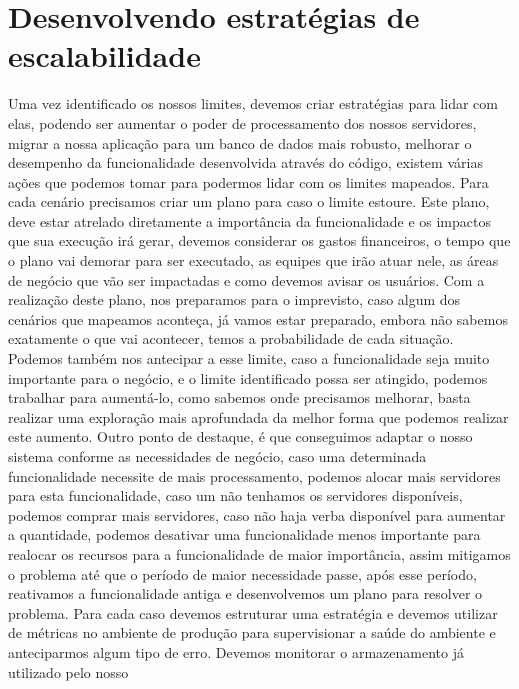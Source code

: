     \section{Desenvolvendo estratégias de escalabilidade}
      Uma vez identificado os nossos limites, devemos criar estratégias para lidar
      com elas, podendo ser aumentar o poder de processamento dos nossos servidores,
      migrar a nossa aplicação para um banco de dados mais robusto, melhorar o
      desempenho da funcionalidade desenvolvida através do código, existem
      várias ações que podemos tomar para podermos lidar com os limites mapeados.
      Para cada cenário precisamos criar um plano para caso o limite estoure. Este
      plano, deve estar atrelado diretamente a importância da funcionalidade e os
      impactos que sua execução irá gerar, devemos considerar os gastos financeiros,
      o tempo que o plano vai demorar para ser executado, as equipes que irão atuar
      nele, as áreas de negócio que vão ser impactadas e como devemos avisar os
      usuários. Com a realização deste plano, nos preparamos para o imprevisto,
      caso algum dos cenários que mapeamos aconteça, já vamos estar preparado,
      embora não sabemos exatamente o que vai acontecer, temos a probabilidade de
      cada situação. Podemos também nos antecipar a esse limite, caso a funcionalidade
      seja muito importante para o negócio, e o limite identificado possa ser atingido,
      podemos trabalhar para aumentá-lo, como sabemos onde precisamos melhorar,
      basta realizar uma exploração mais aprofundada da melhor forma que podemos
      realizar este aumento. Outro ponto de destaque, é que conseguimos adaptar o
      nosso sistema conforme as necessidades de negócio, caso uma determinada
      funcionalidade necessite de mais processamento, podemos alocar mais servidores
      para esta funcionalidade, caso um não tenhamos os servidores disponíveis,
      podemos comprar mais servidores, caso não haja verba disponível para aumentar
      a quantidade, podemos desativar uma funcionalidade menos importante para
      realocar os recursos para a funcionalidade de maior importância, assim
      mitigamos o problema até que o período de maior necessidade passe, após esse
      período, reativamos a funcionalidade antiga e desenvolvemos um plano para
      resolver o problema. \newline
      Para cada caso devemos estruturar uma estratégia e devemos utilizar de métricas
      no ambiente de produção para supervisionar a saúde do ambiente e anteciparmos
      algum tipo de erro. Devemos monitorar o armazenamento já utilizado pelo nosso

